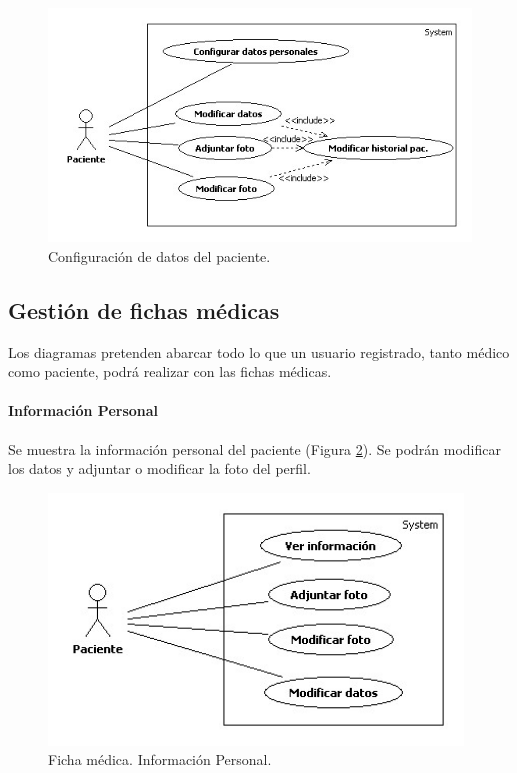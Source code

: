\documentclass[a4paper,oneside,11pt]{book}
\begin{document}
				\begin{figure}[H]
				  \centering
				    \includegraphics[width=12cm]{img/jpg/casos_uso/Datos.jpg}
				  \caption{Configuración de datos del paciente.}
				  \label{fig:datos_pac}
				\end{figure}
			
		
	
		\subsection{Gestión de fichas médicas} %
		\label{sec:gestion_de_fichas_medicas}
			
			Los diagramas pretenden abarcar todo lo que un usuario registrado, tanto médico como paciente, podrá realizar con las fichas médicas.
			\paragraph{Información Personal} %
			\label{par:informacion_personal}
				Se muestra la información personal del paciente (Figura \ref{fig:infpers_fic}). Se podrán modificar los datos y adjuntar o modificar la foto del perfil.
				\begin{figure}[H]
				  \centering
				    \includegraphics[width=11cm]{img/jpg/casos_uso/Informacion_personal.jpg}
				  \caption{Ficha médica. Información Personal.}
				  \label{fig:infpers_fic}
				\end{figure}
		
\end{document}
